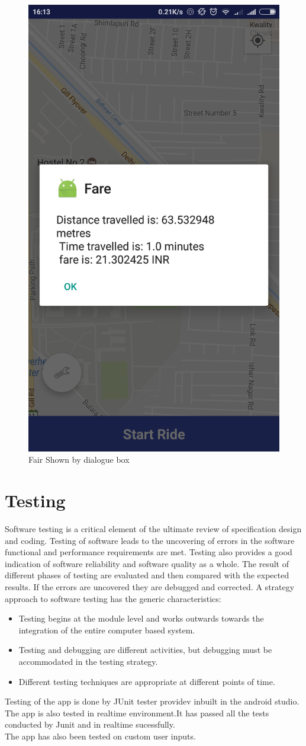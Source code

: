 \begin{figure}[h]
	\centering
	\includegraphics[width=0.7\linewidth]{p02}
	\caption{Fair Shown by dialogue box}
\end{figure}


\section{Testing}
Software testing is a critical element of the ultimate review of specification design and coding. Testing of software leads to the uncovering of errors in the software functional and
performance requirements are met. Testing also provides a good indication of software reliability and software quality as a whole. The result of different phases of testing are evaluated and then compared with the expected results. If the errors are uncovered they are debugged and corrected. A strategy approach to software testing has the generic characteristics:
\begin{itemize}
	\item Testing begins at the module level and works outwards towards the integration of
	the entire computer based system.
	\item Testing and debugging are different activities, but debugging must be accommodated in the testing strategy.
	\item Different testing techniques are appropriate at different points of time.
\end{itemize}
Testing of the app is done by JUnit tester providev inbuilt in the android studio.
\\
The app is also tested in realtime environment.It has passed all the tests conducted by Junit and in realtime sucessfully.
\\
The app has also been tested on custom user inputs.
